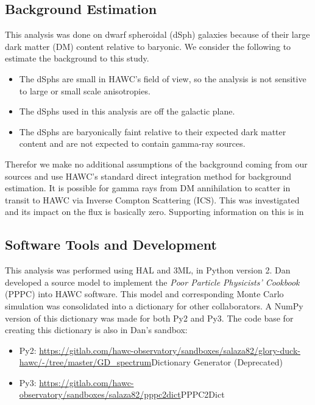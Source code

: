 \subsection{Background Estimation}\label{sec:gd_bkgd}

This analysis was done on dwarf spheroidal (dSph) galaxies because of their large dark matter (DM) content relative to baryonic.
We consider the following to estimate the background to this study.

\begin{itemize}
    \item The dSphs are small in HAWC's field of view, so the analysis is not sensitive to large or small scale anisotropies.
    \item The dSphs used in this analysis are off the galactic plane.
    \item The dSphs are baryonically faint relative to their expected dark matter content and are not expected to contain gamma-ray sources.
\end{itemize}

Therefor we make no additional assumptions of the background coming from our sources and use HAWC's standard direct integration method for background estimation.
It is possible for gamma rays from DM annihilation to scatter in transit to HAWC via Inverse Compton Scattering (ICS).
This was investigated and its impact on the flux is basically zero.
Supporting information on this is in 

\subsection{Software Tools and Development}\label{sec:gd_tools}

This analysis was performed using HAL and 3ML, in Python version 2.\cite{Abeysekara_2017, vianello2015multimission}
Dan developed a source model to implement the \emph{Poor Particle Physicists' Cookbook} (PPPC) \cite{Cirelli_2011} into HAWC software.
This model and corresponding Monte Carlo simulation was consolidated into a dictionary for other collaborators.
A NumPy version of this dictionary was made for both Py2 and Py3.
The code base for creating this dictionary is also in Dan's sandbox:

\begin{itemize}
    \item Py2: \url{https://gitlab.com/hawc-observatory/sandboxes/salaza82/glory-duck-hawc/-/tree/master/GD_spectrum}{Dictionary Generator (Deprecated)}
    \item Py3: \url{https://gitlab.com/hawc-observatory/sandboxes/salaza82/pppc2dict}{PPPC2Dict}
\end{itemize}

